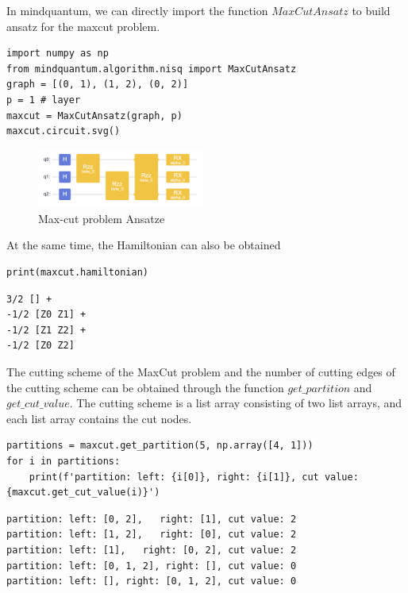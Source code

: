 In mindquantum,  we can directly import the function $MaxCutAnsatz$ to build ansatz for the maxcut problem.
\begin{lstlisting}
import numpy as np
from mindquantum.algorithm.nisq import MaxCutAnsatz
graph = [(0, 1), (1, 2), (0, 2)]
p = 1 # layer
maxcut = MaxCutAnsatz(graph, p)
maxcut.circuit.svg()
\end{lstlisting}
\begin{figure}[H]
    \centering
    \includegraphics[width=0.49\textwidth]{5.2_figures/5.2_QAOA_ansatze}
    \caption{Max-cut problem Ansatze}
    \label{5.1_QAOA}
\end{figure}
At the same time, the Hamiltonian can also be obtained
\begin{lstlisting}
print(maxcut.hamiltonian)
\end{lstlisting}
\begin{lstlisting}
3/2 [] +
-1/2 [Z0 Z1] +
-1/2 [Z1 Z2] +
-1/2 [Z0 Z2]
\end{lstlisting}
The cutting scheme of the MaxCut problem and the number of cutting edges of the cutting scheme can be obtained through the function $get\_partition$ and $get\_cut\_value$. The cutting scheme is a list array consisting of two list arrays, and each list array contains the cut nodes.
\begin{lstlisting}
partitions = maxcut.get_partition(5, np.array([4, 1]))
for i in partitions:
    print(f'partition: left: {i[0]}, right: {i[1]}, cut value: {maxcut.get_cut_value(i)}')
\end{lstlisting}
\begin{lstlisting}
partition: left: [0, 2],   right: [1], cut value: 2
partition: left: [1, 2],   right: [0], cut value: 2
partition: left: [1],   right: [0, 2], cut value: 2
partition: left: [0, 1, 2], right: [], cut value: 0
partition: left: [], right: [0, 1, 2], cut value: 0
\end{lstlisting}










